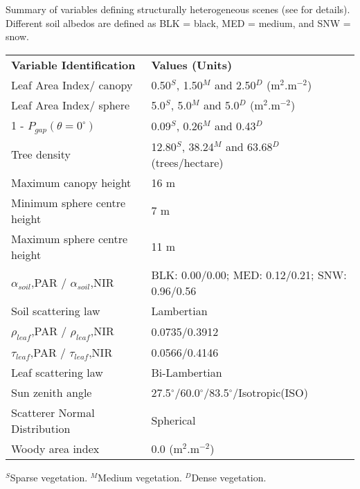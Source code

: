 \begin{threeparttable}
\centering
\caption{Summary of variables defining structurally heterogeneous scenes (see \citet{Widlowski2011} for details). Different soil albedos are defined as BLK = black, MED = medium, and SNW = snow.}
\begin{tabular}{l{} l{}}
     \hline
     \hline
\textbf{Variable Identification}   & \textbf{Values (Units)}\\
\noalign{\smallskip}\hline
Leaf Area Index/ canopy	                & 0.50$^S$, 1.50$^M$ and 2.50$^D$ (m$^2$.m$^{-2}$)\\
Leaf Area Index/ sphere	                & 5.0$^S$, 5.0$^M$ and 5.0$^D$  (m$^2$.m$^{-2}$)\\
1 - $P_{gap} (\theta = 0^{\circ})$      & 0.09$^S$, 0.26$^M$ and 0.43$^D$\\
Tree density                            & 12.80$^S$, 38.24$^M$ and 63.68$^D$ (trees/hectare)\\
Maximum canopy height                   & 16 m\\
Minimum sphere centre height	        & 7 m\\
Maximum sphere centre height	        & 11 m\\
$\alpha_{soil}$,PAR / $\alpha_{soil}$,NIR	& BLK: 0.00/0.00; MED: 0.12/0.21; SNW: 0.96/0.56\\
Soil scattering law	                & Lambertian\\
$\rho_{leaf}$,PAR / $\rho_{leaf}$,NIR   & 0.0735/0.3912\\
$\tau_{leaf}$,PAR / $\tau_{leaf}$,NIR   & 0.0566/0.4146\\
Leaf scattering law                     & Bi-Lambertian\\
Sun zenith angle	                & 27.5$^{\circ}$/60.0$^{\circ}$/83.5$^{\circ}$/Isotropic(ISO)\\
Scatterer Normal Distribution           & Spherical\\
Woody area index                        & 0.0 (m$^2$.m$^{-2}$)\\
\hline
\hline%
\end{tabular}
\begin{tablenotes}
      \small
      \item $^S$Sparse vegetation. $^M$Medium vegetation. $^D$Dense vegetation. 
\end{tablenotes}
\label{tab:RAMI4PILPS}
\end{threeparttable}
\bigskip

